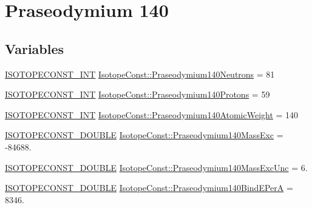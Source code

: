 \hypertarget{group___isotope_const-_praseodymium-_pr140}{}\section{Praseodymium 140}
\label{group___isotope_const-_praseodymium-_pr140}
\subsection*{Variables}
\begin{DoxyCompactItemize}
\item 
\mbox{\hyperlink{group___isotope_const-_macros_ga5f18360b3e99483a35c32d789e62621c}{I\+S\+O\+T\+O\+P\+E\+C\+O\+N\+S\+T\+\_\+\+I\+NT}} \mbox{\hyperlink{group___isotope_const-_praseodymium-_pr140_gae79700a3f03dd0add6e0d163fc8c539b}{Isotope\+Const\+::\+Praseodymium140\+Neutrons}} = 81
\item 
\mbox{\hyperlink{group___isotope_const-_macros_ga5f18360b3e99483a35c32d789e62621c}{I\+S\+O\+T\+O\+P\+E\+C\+O\+N\+S\+T\+\_\+\+I\+NT}} \mbox{\hyperlink{group___isotope_const-_praseodymium-_pr140_ga1e38747501b15468798e998cad97dc90}{Isotope\+Const\+::\+Praseodymium140\+Protons}} = 59
\item 
\mbox{\hyperlink{group___isotope_const-_macros_ga5f18360b3e99483a35c32d789e62621c}{I\+S\+O\+T\+O\+P\+E\+C\+O\+N\+S\+T\+\_\+\+I\+NT}} \mbox{\hyperlink{group___isotope_const-_praseodymium-_pr140_ga8756c32ff18c472c918cc96ddd64e8f1}{Isotope\+Const\+::\+Praseodymium140\+Atomic\+Weight}} = 140
\item 
\mbox{\hyperlink{group___isotope_const-_macros_ga8f45a7272ce02c0b4c65c44636ed719a}{I\+S\+O\+T\+O\+P\+E\+C\+O\+N\+S\+T\+\_\+\+D\+O\+U\+B\+LE}} \mbox{\hyperlink{group___isotope_const-_praseodymium-_pr140_ga2b655a7c228d0e4bfd6244fe939c74af}{Isotope\+Const\+::\+Praseodymium140\+Mass\+Exc}} = -\/84688.
\item 
\mbox{\hyperlink{group___isotope_const-_macros_ga8f45a7272ce02c0b4c65c44636ed719a}{I\+S\+O\+T\+O\+P\+E\+C\+O\+N\+S\+T\+\_\+\+D\+O\+U\+B\+LE}} \mbox{\hyperlink{group___isotope_const-_praseodymium-_pr140_ga6223e21a51ce4eb9bb0a06ecfdec4607}{Isotope\+Const\+::\+Praseodymium140\+Mass\+Exc\+Unc}} = 6.
\item 
\mbox{\hyperlink{group___isotope_const-_macros_ga8f45a7272ce02c0b4c65c44636ed719a}{I\+S\+O\+T\+O\+P\+E\+C\+O\+N\+S\+T\+\_\+\+D\+O\+U\+B\+LE}} \mbox{\hyperlink{group___isotope_const-_praseodymium-_pr140_ga023408a7ff8e600a281ffd5a57dae783}{Isotope\+Const\+::\+Praseodymium140\+Bind\+E\+PerA}} = 8346.

\end{DoxyCompactItemize}
